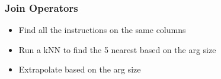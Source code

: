 \begin{frame}
\frametitle{Join Operators}
\begin{itemize}
\item Find all the instructions on the same columns
\item Run a kNN to find the 5 nearest based on the arg size
\item Extrapolate based on the arg size
\end{itemize}
\end{frame}


%
%


